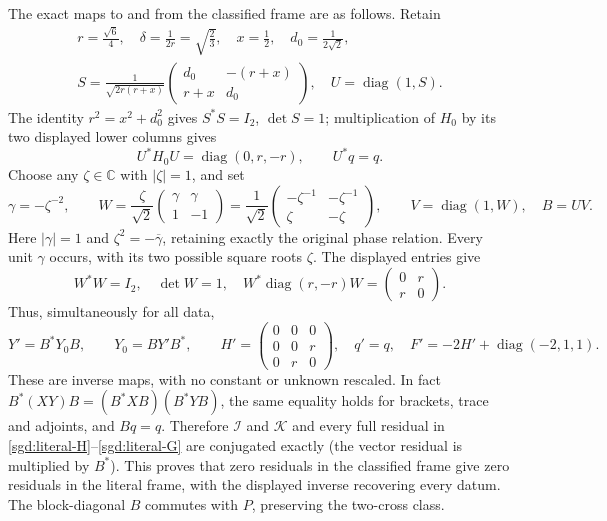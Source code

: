 The exact maps to and from the classified frame are as follows. Retain
\[
 \begin{gathered}
 r=\frac{\sqrt6}{4},\quad \delta=\frac1{2r}=\sqrt{\frac23},\quad
 x=\frac12,\quad d_0=\frac1{2\sqrt2},\\
 S=\frac1{\sqrt{2r(r+x)}}
       \begin{pmatrix}d_0&-(r+x)\\r+x&d_0\end{pmatrix},\quad
 U=\operatorname{diag}(1,S).
 \end{gathered}
\]
The identity $r^2=x^2+d_0^2$ gives $S^*S=I_2$, $\det S=1$;
multiplication of $H_0$ by its two displayed lower columns gives
\[
 U^*H_0U=\operatorname{diag}(0,r,-r),\qquad U^*q=q.
\]
Choose any $\zeta\in\mathbb C$ with $|\zeta|=1$, and set
\[
 \gamma=-\zeta^{-2},\qquad
 W=\frac\zeta{\sqrt2}\begin{pmatrix}\gamma&\gamma\\1&-1\end{pmatrix}
  =\frac1{\sqrt2}\begin{pmatrix}-\zeta^{-1}&-\zeta^{-1}\\
                         \zeta&-\zeta\end{pmatrix},\qquad
 V=\operatorname{diag}(1,W),\quad B=UV.
\]
Here $|\gamma|=1$ and $\zeta^2=-\overline\gamma$, retaining exactly
the original phase relation. Every unit $\gamma$ occurs, with its two
possible square roots $\zeta$. The displayed entries give
\[
 W^*W=I_2,\quad \det W=1,\quad
 W^*\operatorname{diag}(r,-r)W=\begin{pmatrix}0&r\\r&0\end{pmatrix}.
\]
Thus, simultaneously for all data,
\begin{equation}
 Y'=B^*Y_0B,\qquad Y_0=BY'B^*,\qquad
 H'=\begin{pmatrix}0&0&0\\0&0&r\\0&r&0\end{pmatrix},\quad
 q'=q,\quad F'=-2H'+\operatorname{diag}(-2,1,1).
 \label{sgd:frame}
\end{equation}
These are inverse maps, with no constant or unknown rescaled. In fact
$B^*(XY)B=(B^*XB)(B^*YB)$, the same equality holds for brackets,
trace and adjoints, and $Bq=q$. Therefore $\mathcal I$ and $\mathcal K$
and every full residual in \eqref{sgd:literal-H}--\eqref{sgd:literal-G}
are conjugated exactly (the vector residual is multiplied by $B^*$).
This proves that zero residuals in the classified frame give zero residuals
in the literal frame, with the displayed inverse recovering every datum.
The block-diagonal $B$ commutes with $P$, preserving the two-cross class.

